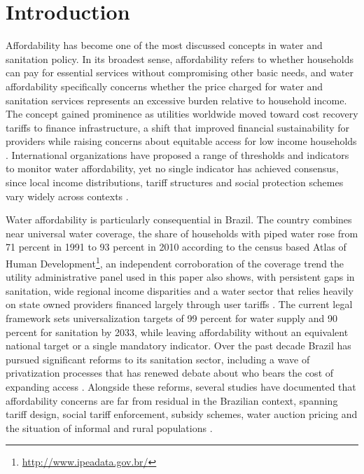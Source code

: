 \documentclass[pdflatex,sn-mathphys-num]{sn-jnl}%
\theoremstyle{thmstyleone}%
\theoremstyle{thmstyletwo}%
\theoremstyle{thmstylethree}%
\begin{document}
\section{Introduction}\label{sec1}

Affordability has become one of the most discussed concepts in water and sanitation policy\cite{Fagundes2025b,Skerker2024,Patterson2023,RomeroGomez2024,Pierce2021,Teodoro2018}. In its broadest sense, affordability refers to whether households can pay for essential services without compromising other basic needs, and water affordability specifically concerns whether the price charged for water and sanitation services represents an excessive burden relative to household income\cite{Fagundes2023,Pierce2021,Teodoro2018,Vanhille2018,Wichman2025}. The concept gained prominence as utilities worldwide moved toward cost recovery tariffs to finance infrastructure, a shift that improved financial sustainability for providers while raising concerns about equitable access for low income households \citep{Wichman2025,Patterson2023}. International organizations have proposed a range of thresholds and indicators to monitor water affordability, yet no single indicator has achieved consensus, since local income distributions, tariff structures and social protection schemes vary widely across contexts \citep{Skerker2024,Torio2025}.

Water affordability is particularly consequential in Brazil. The country combines near universal water coverage, the share of households with piped water rose from 71 percent in 1991 to 93 percent in 2010 according to the census based Atlas of Human Development\footnote{\url{http://www.ipeadata.gov.br/}}, an independent corroboration of the coverage trend the utility administrative panel used in this paper also shows, with persistent gaps in sanitation, wide regional income disparities and a water sector that relies heavily on state owned providers financed largely through user tariffs \citep{Andres2024,Barbosa2024}. The current legal framework sets universalization targets of 99 percent for water supply and 90 percent for sanitation by 2033, while leaving affordability without an equivalent national target or a single mandatory indicator. Over the past decade Brazil has pursued significant reforms to its sanitation sector, including a wave of privatization processes that has renewed debate about who bears the cost of expanding access \citep{Fagundes2025c,Barra2026,Bermann2024}. Alongside these reforms, several studies have documented that affordability concerns are far from residual in the Brazilian context, spanning tariff design, social tariff enforcement, subsidy schemes, water auction pricing and the situation of informal and rural populations \citep{Amorim2025,Fraga2025,Moreira2025,Correa2026,Lopes2024,Fagundes2024,Mendes2026,LimaeSilva2026}.
\end{document}

